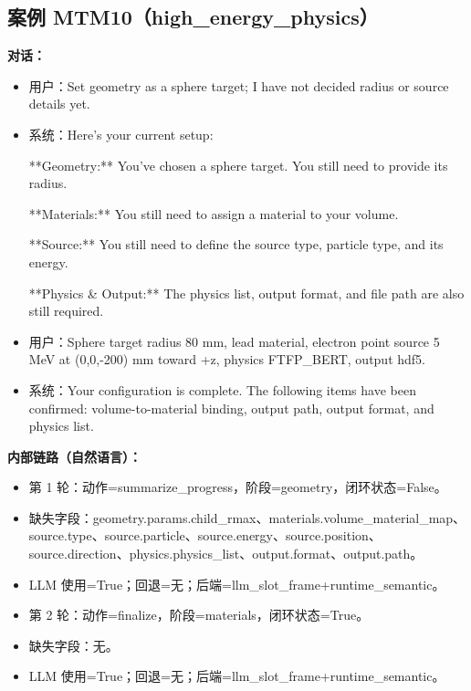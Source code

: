 \documentclass[11pt]{ctexart}
\begin{document}
\subsection{案例 MTM10（high\_energy\_physics）}
\textbf{对话：}
\begin{itemize}
\item 用户：Set geometry as a sphere target; I have not decided radius or source details yet.
\item 系统：Here's your current setup:

**Geometry:** You've chosen a sphere target. You still need to provide its radius.

**Materials:** You still need to assign a material to your volume.

**Source:** You still need to define the source type, particle type, and its energy.

**Physics \& Output:** The physics list, output format, and file path are also still required.
\item 用户：Sphere target radius 80 mm, lead material, electron point source 5 MeV at (0,0,-200) mm toward +z, physics FTFP\_BERT, output hdf5.
\item 系统：Your configuration is complete. The following items have been confirmed: volume-to-material binding, output path, output format, and physics list.
\end{itemize}
\textbf{内部链路（自然语言）：}
\begin{itemize}
\item 第 1 轮：动作=summarize\_progress，阶段=geometry，闭环状态=False。
\item 缺失字段：geometry.params.child\_rmax、materials.volume\_material\_map、source.type、source.particle、source.energy、source.position、source.direction、physics.physics\_list、output.format、output.path。
\item LLM 使用=True；回退=无；后端=llm\_slot\_frame+runtime\_semantic。
\item 第 2 轮：动作=finalize，阶段=materials，闭环状态=True。
\item 缺失字段：无。
\item LLM 使用=True；回退=无；后端=llm\_slot\_frame+runtime\_semantic。
\end{itemize}
\end{document}
